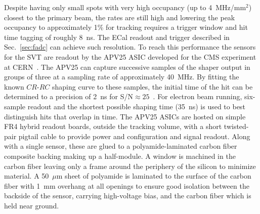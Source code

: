 \documentclass[final,3p,times,twocolumn]{elsarticle}
\begin{document}
Despite having only small spots with very high occupancy (up to 4~MHz/mm$^2$) closest to the primary 
beam, the rates are still high and lowering the peak occupancy to 
approximately 1\% for tracking requires a trigger window and hit time tagging of roughly 8~ns. The 
ECal readout and trigger described in Sec.~\ref{sec:fadc} can achieve such resolution. To reach this 
performance the sensors for the SVT are readout by the APV25 ASIC developed for the CMS 
experiment at CERN~\cite{French:2001xb}. The APV25 can capture successive samples of the shaper output 
in groups of three at a sampling rate of approximately 40~MHz.  By fitting the known 
$CR$-$RC$ shaping curve to these samples, the initial time of the hit can be determined to a precision 
of 2~ns for S/N$\approx25$~\cite{Friedl:2009zz}.  For electron beam running, six-sample readout and 
the shortest possible shaping time (35~ns) is used to best distinguish hits that overlap in time.
The APV25 ASICs are hosted on simple FR4 hybrid readout boards, outside the tracking volume, with a 
short twisted-pair pigtail cable to provide power and configuration and signal readout. Along with a 
single sensor, these are glued to a polyamide-laminated carbon fiber composite backing making 
up a half-module. A window is machined in the carbon fiber leaving only a frame around the periphery 
of the silicon to minimize material. A 50~$\mu$m sheet of polyamide is laminated to the surface of the 
carbon fiber with 1~mm overhang at all openings to ensure good isolation between the backside of the 
sensor, carrying high-voltage bias, and the carbon fiber which is held near ground. 
\end{document}

